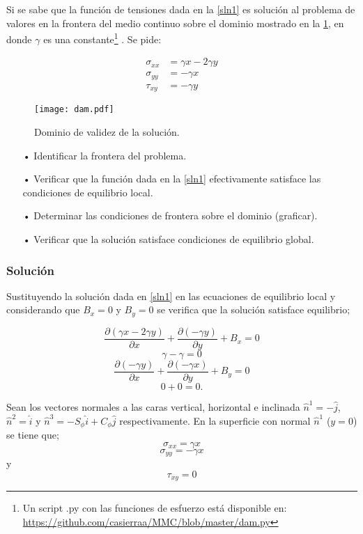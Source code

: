 \documentclass[../notas medios.tex]{subfiles}
\begin{document}
Si se sabe que la función de tensiones dada en la \cref{sln1} es solución al problema de valores en la frontera del medio continuo sobre el dominio mostrado en la \cref{dam}, en donde $\gamma$ es una constante\footnote{Un script .py con las funciones de esfuerzo está disponible en:  {\url{https://github.com/casierraa/MMC/blob/master/dam.py}}} . Se pide: 

\begin{equation}
\begin{split}
{\sigma _{xx}} & = \gamma x - 2\gamma y \\
{\sigma _{yy}} & =  - \gamma x \\
{\tau _{xy}}   & =  - \gamma y
\end{split}
\label{sln1}
\end{equation}

\begin{figure}[H]
\centering
	\texttt{[image: dam.pdf]}
	\caption{Dominio de validez de la solución.}
	\label{dam}
\end{figure}


\begin{itemize}
\item[•] Identificar la frontera del problema.
\item[•] Verificar que la función dada en la \cref{sln1} efectivamente satisface las condiciones de equilibrio local.
\item[•] Determinar las condiciones de frontera sobre el dominio (graficar).
\item[•] Verificar que la solución satisface condiciones de equilibrio global.
\end{itemize}


\subsubsection*{Solución}
Sustituyendo la solución dada en \cref{sln1} en las ecuaciones de equilibrio local y considerando que $B_x =0$ y $B_y =0$ se verifica que la solución satisface equilibrio;

\[\frac{{\partial (\gamma x - 2\gamma y)}}{{\partial x}} + \frac{{\partial ( - \gamma y)}}{{\partial y}} + {B_x} = 0\]
\[\gamma  - \gamma  = 0\] 
\[\frac{{\partial ( - \gamma y)}}{{\partial x}} + \frac{{\partial ( - \gamma x)}}{{\partial y}} + {B_y} = 0\]
\[0 + 0 = 0.\]

Sean los vectores normales a las caras vertical, horizontal e inclinada ${{\hat n}^1} =  - \hat j$, ${{\hat n}^2} =   \hat i$ y ${{\hat n}^3} =  - {S_\phi }\hat i + {C_\phi }\hat j$ respectivamente. En la superficie con normal ${{\hat n}^1}$ ($y=0$) se tiene que;
\[{\sigma _{xx}} = \gamma x\]
\[{\sigma _{yy}} =  - \gamma x\]
y
\[{\tau _{xy}} = 0 \]
\end{document}
